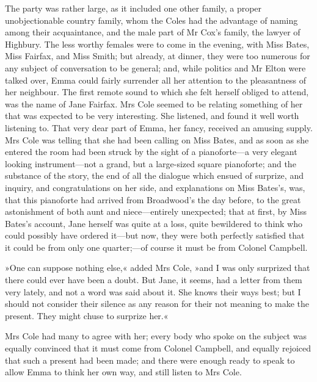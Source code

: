 The party was rather large, as it included one other family, a proper unobjectionable country family, whom the Coles had the advantage of naming among their acquaintance, and the male part of Mr Cox's family, the lawyer of Highbury. The less worthy females were to come in the evening, with Miss Bates, Miss Fairfax, and Miss Smith; but already, at dinner, they were too numerous for any subject of conversation to be general; and, while politics and Mr Elton were talked over, Emma could fairly surrender all her attention to the pleasantness of her neighbour. The first remote sound to which she felt herself obliged to attend, was the name of Jane Fairfax. Mrs Cole seemed to be relating something of her that was expected to be very interesting. She listened, and found it well worth listening to. That very dear part of Emma, her fancy, received an amusing supply. Mrs Cole was telling that she had been calling on Miss Bates, and as soon as she entered the room had been struck by the sight of a pianoforte—a very elegant looking instrument—not a grand, but a large-sized square pianoforte; and the substance of the story, the end of all the dialogue which ensued of surprize, and inquiry, and congratulations on her side, and explanations on Miss Bates's, was, that this pianoforte had arrived from Broadwood's the day before, to the great astonishment of both aunt and niece—entirely unexpected; that at first, by Miss Bates's account, Jane herself was quite at a loss, quite bewildered to think who could possibly have ordered it—but now, they were both perfectly satisfied that it could be from only one quarter;—of course it must be from Colonel Campbell.

»One can suppose nothing else,« added Mrs Cole, »and I was only surprized that there could ever have been a doubt. But Jane, it seems, had a letter from them very lately, and not a word was said about it. She knows their ways best; but I should not consider their silence as any reason for their not meaning to make the present. They might chuse to surprize her.«

Mrs Cole had many to agree with her; every body who spoke on the subject was equally convinced that it must come from Colonel Campbell, and equally rejoiced that such a present had been made; and there were enough ready to speak to allow Emma to think her own way, and still listen to Mrs Cole.

